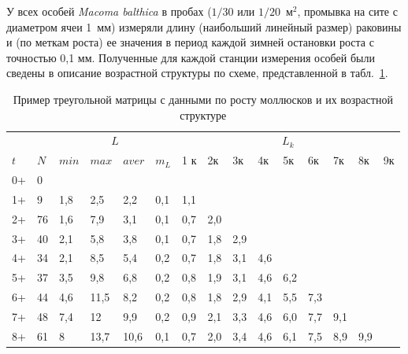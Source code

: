 У всех особей {\it Macoma balthica} в пробах ($1/30$ или $1/20$~м$^2$, промывка на сите с диаметром ячеи 1~мм) измеряли длину (наибольший линейный размер) раковины и (по меткам роста) ее значения в период каждой зимней остановки роста с точностью 0,1 мм.
Полученные для каждой станции измерения особей были сведены в описание возрастной структуры по схеме, представленной в табл.~\ref{tab:rost_matrica_primer}. 
\begin{table}[p]
        \caption{Пример треугольной матрицы с данными по росту моллюсков и их возрастной структуре}
        \label{tab:rost_matrica_primer}
        \begin{tabularx}{\textwidth}{|X|X|XX|XX|XXXXXXXXX|}
        \hline
        &    & \multicolumn{4}{c|}{$L$}               & \multicolumn{9}{c|}{$L_{k}$} \\ 
        $t$     & $N$  & $min$ & $max$ & $aver$ & $m_{L}$   & 1 к & 2к  & 3к  & 4к  & 5к  & 6к  & 7к  & 8к   & 9к   \\ \hline
        0+      & 0  &       &       &         &         &     &     &     &     &     &     &     &      &      \\
        1+      & 9  & 1,8   & 2,5   & 2,2     & 0,1     & 1,1 &     &     &     &     &     &     &      &      \\
        2+      & 76 & 1,6   & 7,9   & 3,1     & 0,1     &\cellcolor{yellow}0,7 & \cellcolor{yellow}2,0 &     &     &     &     &     &      &      \\
        3+      & 40 & 2,1   & 5,8   & 3,8     & 0,1     & 0,7 & 1,8 & 2,9 &     &     &     &     &      &      \\
        4+      & 34 & 2,1   & 8,5   & 5,4     & 0,2     & 0,7 & 1,8 & 3,1 & 4,6 &     &     &     &      &      \\
        5+      & 37 & 3,5   & 9,8   & 6,8     & 0,2     & 0,8 & 1,9 & 3,1 & 4,6 & 6,2 &     &     &      &      \\
        6+      & 44 & 4,6   & 11,5  & 8,2     & 0,2     & 0,8 & 1,8 & 2,9 & 4,1 & 5,5 & 7,3 &     &      &      \\
        7+      & 48 & 7,4   & 12    & 9,9     & 0,2     & 0,9 & 2,1 & 3,3 & 4,6 & 6,0 & 7,7 & 9,1 &      &      \\
        8+      & 61 & 8     & 13,7  & 10,6    & 0,1     & \cellcolor{red}0,7 & \cellcolor{red}2,0 & \cellcolor{red}3,4 & \cellcolor{red}4,6 & \cellcolor{red}6,1 & \cellcolor{red}7,5 & \cellcolor{red}8,9 & \cellcolor{red}9,9  &      \\

\end{tabularx}
\end{table}
